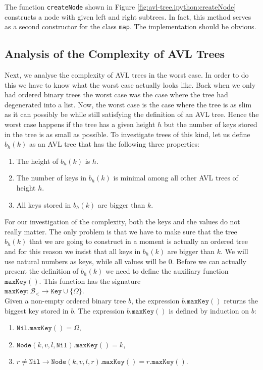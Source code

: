 The function \texttt{createNode} shown in Figure \ref{fig:avl-tree.ipython:createNode}
constructs a node with given left and right subtrees.  In fact, this method serves as a second
constructor for the class \texttt{map}.  The implementation should be obvious.


\subsection{Analysis of the Complexity of AVL Trees}
Next, we analyse the complexity of AVL trees in the worst case.  In order to do this we have to know
what the worst case actually looks like.  Back when we only had ordered binary trees the worst case was the case where
the tree had degenerated into a list.  Now, the worst case is the case where the tree is as slim as
it can possibly be while still satisfying the definition of an AVL tree.  Hence the worst case
happens if the tree has a given height $h$ but the number of keys stored in the tree is as small as
possible.  To investigate trees of this kind, let us define  $b_h(k)$ as an AVL tree that has the following three
properties:
\begin{enumerate}
\item The height of $b_h(k)$ is $h$.
\item The number of keys in $b_h(k)$ is minimal among all other AVL trees of height $h$.  
\item All keys stored in  $b_h(k)$ are bigger than  $k$.  
\end{enumerate}
For our investigation of the
complexity, both the keys and the values do not really matter.  The only problem is that we have to
make sure that the tree $b_h(k)$ that we are going to construct in a moment is actually an ordered
tree and for this reason we insist that all keys in $b_h(k)$ are bigger than $k$.  We will use
natural numbers as keys, while all values will be $0$.
Before we can actually present the definition of  $b_h(k)$ we need to define the auxiliary function
 $\texttt{maxKey}()$.  This function has the signature 
\\[0.2cm]
\hspace*{1.3cm}
$\texttt{maxKey}:\mathcal{B}_< \rightarrow \texttt{Key} \cup \{ \Omega \}$.
\\[0.2cm]
Given a non-empty ordered binary tree  $b$, the expression $b.\texttt{maxKey}()$ returns the biggest
key stored in $b$.  The expression  $b.\texttt{maxKey}()$ is defined by induction on $b$:
\begin{enumerate}
\item $\texttt{Nil}.\texttt{maxKey}() = \Omega$,
\item $\texttt{Node}(k,v,l,\texttt{Nil}).\texttt{maxKey}() = k$,
\item $r \not= \texttt{Nil} \rightarrow \texttt{Node}(k,v,l,r).\texttt{maxKey}() = r.\texttt{maxKey}()$.
\end{enumerate}
